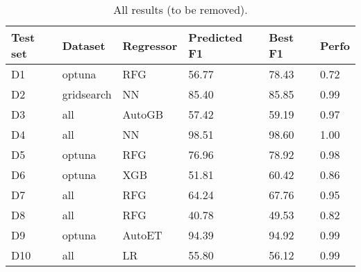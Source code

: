 \begin{table}[ht!]
\caption{All results (to be removed).}
\label{tab:dl-results}
\begin{tabular}{|p{0.5cm}|l|p{1.2cm}|p{1.2cm}|p{1cm}|l|}
\hline
\textbf{Test set} & \textbf{Dataset} & \textbf{Regressor} & \textbf{Predicted F1} & \textbf{Best F1} & \textbf{Perfo} \\
\hline
D1 & optuna & RFG & 56.77 & 78.43 & 0.72 \\
D2 & gridsearch & NN & 85.40 & 85.85 & 0.99 \\
D3 & all &  AutoGB & 57.42 & 59.19 & 0.97 \\
D4 & all & NN & 98.51 & 98.60 & 1.00 \\
D5 & optuna & RFG & 76.96 & 78.92 & 0.98 \\
D6 & optuna & XGB & 51.81 & 60.42 & 0.86 \\
D7 & all & RFG & 64.24 & 67.76 & 0.95 \\
D8 & all & RFG & 40.78 & 49.53 & 0.82 \\
D9 & optuna &  AutoET & 94.39 & 94.92 & 0.99 \\
D10 & all & LR & 55.80 & 56.12 & 0.99 \\
\bottomrule
\end{tabular}
\end{table}     
